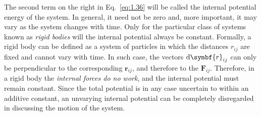 The second term on the right in Eq.~\eqref{eq:1.36} will be called the internal potential energy of the system. In general, it need not be zero and, more important, it may vary as the system changes with time. Only for the particular class of systems known as \emph{rigid bodies} will the internal potential always be constant. Formally, a rigid body can be defined as a system of particles in which the distances \(r_{ij}\) are fixed and cannot vary with time. In such case, the vectors \(\odif{\symbf{r}_{ij}}\) can only be perpendicular to the corresponding \(\symbf{r}_{ij}\), and therefore to the \(\symbf{F}_{ij}\). Therefore, in a rigid body the \emph{internal forces do no work}, and the internal potential must remain constant. Since the total potential is in any case uncertain to within an additive constant, an unvarying internal potential can be completely disregarded in discussing the motion of the system.
